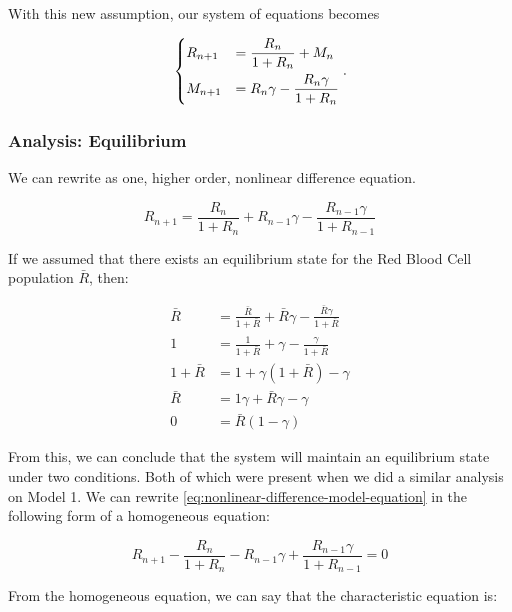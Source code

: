 With this new assumption, our system of equations becomes

\begin{equation}
    \begin{dcases}
        R_{n+1} &= \frac{R_n}{1 + R_n} + M_n\\
        M_{n+1} &= R_n\gamma-\frac{R_n\gamma}{1+R_n}
    \end{dcases}.
    \label{eq:nonlinear-difference-model-system}
\end{equation}

\subsubsection{Analysis: Equilibrium}

We can rewrite  as one, higher order, nonlinear difference equation.

\begin{equation}
    R_{n+1} = \frac{R_n}{1 + R_n} + R_{n-1}\gamma-\frac{R_{n-1}\gamma}{1+R_{n-1}}
    \label{eq:nonlinear-difference-model-equation}
\end{equation}

If we assumed that there exists an equilibrium state for the Red Blood Cell population $\bar{R}$, then:

\begin{align*}
     \bar{R} &= \frac{\bar{R}}{1 + \bar{R}} + \bar{R}\gamma - \frac{\bar{R}\gamma}{1+\bar{R}}\\
     1 &= \frac{1}{1 + \bar{R}} + \gamma - \frac{\gamma}{1+\bar{R}}\\
     1 + \bar{R} &= 1 + \gamma(1 + \bar{R}) - \gamma\\
     \bar{R} &= 1\gamma + \bar{R}\gamma - \gamma\\
     0 &= \bar{R}(1-\gamma)
\end{align*}

From this, we can conclude that the system will maintain an equilibrium state under two conditions. Both of which were present when we did a similar analysis on Model 1. We can rewrite \eqref{eq:nonlinear-difference-model-equation} in the following form of a homogeneous equation:

\begin{equation*}
    R_{n+1} - \frac{R_n}{1 + R_n} - R_{n-1}\gamma + \frac{R_{n-1}\gamma}{1+R_{n-1}} = 0
\end{equation*}

From the homogeneous equation, we can say that the characteristic equation is:

